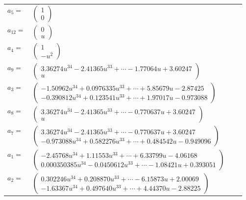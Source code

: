 \documentclass[1p]{elsarticle_modified}
\theoremstyle{definition}
\begin{document}
\begin{tabular}{m{7pt} m{180pt} m{7pt} m{180pt} }
\flushright $a_{5}=$&$\begin{pmatrix}1\\0\end{pmatrix}$ \\
\flushright $a_{12}=$&$\begin{pmatrix}0\\u\end{pmatrix}$ \\
\flushright $a_{4}=$&$\begin{pmatrix}1\\- u^2\end{pmatrix}$ \\
\flushright $a_{9}=$&$\begin{pmatrix}3.36274 u^{34}-2.41365 u^{33}+\cdots-1.77064 u+3.60247\\u\end{pmatrix}$ \\
\flushright $a_{3}=$&$\begin{pmatrix}-1.50962 u^{34}+0.0976335 u^{33}+\cdots+5.85679 u-2.87425\\-0.390812 u^{34}+0.123541 u^{33}+\cdots+1.97017 u-0.973088\end{pmatrix}$ \\
\flushright $a_{8}=$&$\begin{pmatrix}3.36274 u^{34}-2.41365 u^{33}+\cdots-0.770637 u+3.60247\\u\end{pmatrix}$ \\
\flushright $a_{7}=$&$\begin{pmatrix}3.36274 u^{34}-2.41365 u^{33}+\cdots-0.770637 u+3.60247\\-0.973088 u^{34}+0.582276 u^{33}+\cdots+0.484542 u-0.949096\end{pmatrix}$ \\
\flushright $a_{1}=$&$\begin{pmatrix}-2.45768 u^{34}+1.11553 u^{33}+\cdots+6.33799 u-4.06168\\0.000350385 u^{34}-0.0450612 u^{33}+\cdots-1.08421 u+0.393051\end{pmatrix}$ \\
\flushright $a_{2}=$&$\begin{pmatrix}0.302246 u^{34}+0.208870 u^{33}+\cdots-6.15873 u+2.00069\\-1.63367 u^{34}+0.497640 u^{33}+\cdots+4.44370 u-2.88225\end{pmatrix}$ \\

\end{tabular}
\end{document}
